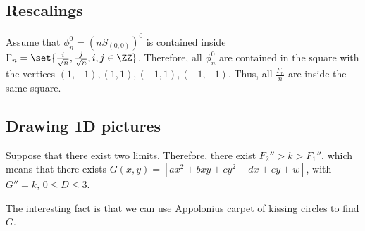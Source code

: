 \documentclass[11pt]{scrartcl}
\begin{document}
  \subsection{Rescalings}

  Assume that $\phi_{n}^{0}= (nS_{(0,0)})^{0}$ is contained inside
  $\Gamma_{n} = \set{\frac{i}{\sqrt{n}}, \frac{j}{\sqrt{n}}, i, j \in
    \ZZ}$. Therefore, all $\phi_{n}^{0}$ are contained in the square
  with the vertices $(1, -1), (1, 1), (-1, 1), (-1, -1)$. Thus, all
  $\frac{F_{n}}{n}$ are inside the same square.

  \subsection{Drawing 1D pictures}

  Suppose that there exist two limits. Therefore, there exist
  $F_{2}'' > k > F_{1}''$, which means that there exists
  $G(x, y) = [ax^{2} + bxy + c y^{2} + dx + ey + w]$, with $G'' = k$,
  $0 \leq D \leq 3$.

  The interesting fact is that we can use Appolonius carpet of kissing
  circles to find $G$.

  
\end{document}
